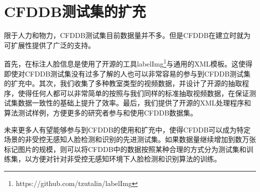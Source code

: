 \section{CFDDB测试集的扩充}

限于人力和物力，CFDDB测试集目前数据量并不多。但是CFDDB在建立时就为可扩展性提供了广泛的支持。

首先，在标注人脸信息是使用了开源的工具labelImg\footnote{https://github.com/tzutalin/labelImg}与通用的XML模板。这使得即使对CFDDB测试集没有过多了解的人也可以非常容易的参与到CFDDB测试集的扩充中。其次，我们收集了多种教室类型的视频数据，并设计了开源的抽取程序，使得任何人都可以非常简单的按照与我们同样的标准抽取视频数据，在保证测试集数据一致性的基础上提升了效率。最后，我们提供了开源的XML处理程序和算法测试样例，方便更多的研究者参与和使用CFDDB数据集。

未来更多人有望能够参与到CFDDB的使用和扩充中，使得CFDDB可以成为特定场景的非受控无感知人脸检测和识别的先进测试集。如果数据量继续增加到数万张标记图片的规模，则可以将CFDDB中的数据按照某种合理的方式分为测试集和训练集，以方便对针对非受控无感知环境下人脸检测和识别算法的训练。
